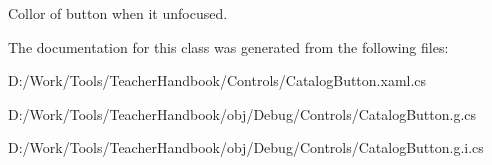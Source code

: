 Collor of button when it unfocused. 



The documentation for this class was generated from the following files\+:\begin{DoxyCompactItemize}
\item 
D\+:/\+Work/\+Tools/\+Teacher\+Handbook/\+Controls/Catalog\+Button.\+xaml.\+cs\item 
D\+:/\+Work/\+Tools/\+Teacher\+Handbook/obj/\+Debug/\+Controls/Catalog\+Button.\+g.\+cs\item 
D\+:/\+Work/\+Tools/\+Teacher\+Handbook/obj/\+Debug/\+Controls/Catalog\+Button.\+g.\+i.\+cs\end{DoxyCompactItemize}
